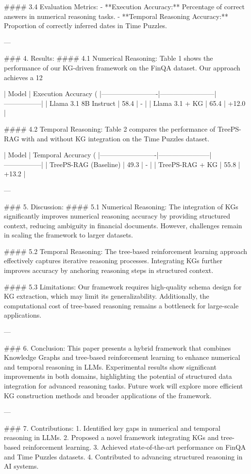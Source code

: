 #### 3.4 Evaluation Metrics:
- **Execution Accuracy:** Percentage of correct answers in numerical reasoning tasks.
- **Temporal Reasoning Accuracy:** Proportion of correctly inferred dates in Time Puzzles.

---

### 4. Results:
#### 4.1 Numerical Reasoning:
Table 1 shows the performance of our KG-driven framework on the FinQA dataset. Our approach achieves a 12%

| Model                   | Execution Accuracy (%
|-------------------------|------------------------|-----------------|
| Llama 3.1 8B Instruct   | 58.4                  | -               |
| Llama 3.1 + KG          | 65.4                  | +12.0           |

#### 4.2 Temporal Reasoning:
Table 2 compares the performance of TreePS-RAG with and without KG integration on the Time Puzzles dataset.

| Model                   | Temporal Accuracy (%
|-------------------------|-----------------------|-----------------|
| TreePS-RAG (Baseline)   | 49.3                 | -               |
| TreePS-RAG + KG         | 55.8                 | +13.2           |

---

### 5. Discussion:
#### 5.1 Numerical Reasoning:
The integration of KGs significantly improves numerical reasoning accuracy by providing structured context, reducing ambiguity in financial documents. However, challenges remain in scaling the framework to larger datasets.

#### 5.2 Temporal Reasoning:
The tree-based reinforcement learning approach effectively captures iterative reasoning processes. Integrating KGs further improves accuracy by anchoring reasoning steps in structured context.

#### 5.3 Limitations:
Our framework requires high-quality schema design for KG extraction, which may limit its generalizability. Additionally, the computational cost of tree-based reasoning remains a bottleneck for large-scale applications.

---

### 6. Conclusion:
This paper presents a hybrid framework that combines Knowledge Graphs and tree-based reinforcement learning to enhance numerical and temporal reasoning in LLMs. Experimental results show significant improvements in both domains, highlighting the potential of structured data integration for advanced reasoning tasks. Future work will explore more efficient KG construction methods and broader applications of the framework.

---

### 7. Contributions:
1. Identified key gaps in numerical and temporal reasoning in LLMs.
2. Proposed a novel framework integrating KGs and tree-based reinforcement learning.
3. Achieved state-of-the-art performance on FinQA and Time Puzzles datasets.
4. Contributed to advancing structured reasoning in AI systems.